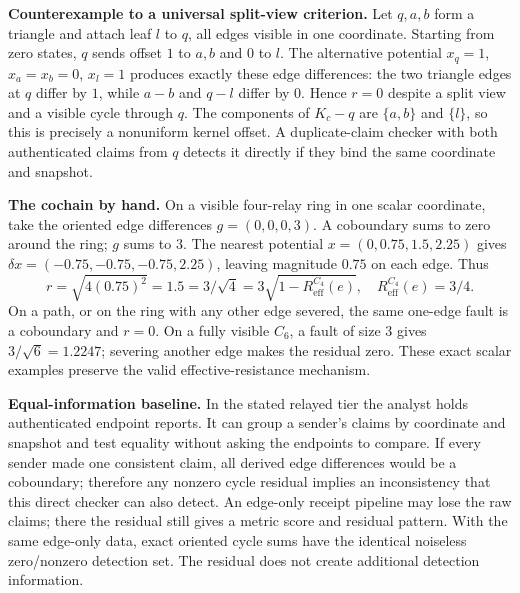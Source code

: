 \documentclass[11pt,a4paper]{article}
\begin{document}
\textbf{Counterexample to a universal split-view criterion.} Let $q,a,b$ form a triangle and attach leaf $l$ to $q$, all edges visible in one coordinate. Starting from zero states, $q$ sends offset $1$ to $a,b$ and $0$ to $l$. The alternative potential $x_q=1$, $x_a=x_b=0$, $x_l=1$ produces exactly these edge differences: the two triangle edges at $q$ differ by $1$, while $a-b$ and $q-l$ differ by $0$. Hence $r=0$ despite a split view and a visible cycle through $q$. The components of $K_c-q$ are $\{a,b\}$ and $\{l\}$, so this is precisely a nonuniform kernel offset. A duplicate-claim checker with both authenticated claims from $q$ detects it directly if they bind the same coordinate and snapshot.

\textbf{The cochain by hand.} On a visible four-relay ring in one scalar coordinate, take the oriented edge differences $g=(0,0,0,3)$. A coboundary sums to zero around the ring; $g$ sums to $3$. The nearest potential $x=(0,0.75,1.5,2.25)$ gives $\delta x=(-0.75,-0.75,-0.75,2.25)$, leaving magnitude $0.75$ on each edge. Thus
\[
r=\sqrt{4(0.75)^2}=1.5=3/\sqrt4=3\sqrt{1-R_{\mathrm{eff}}^{C_4}(e)},\quad R_{\mathrm{eff}}^{C_4}(e)=3/4.
\]
On a path, or on the ring with any other edge severed, the same one-edge fault is a coboundary and $r=0$. On a fully visible $C_6$, a fault of size $3$ gives $3/\sqrt6=1.2247$; severing another edge makes the residual zero. These exact scalar examples preserve the valid effective-resistance mechanism.



\textbf{Equal-information baseline.} In the stated relayed tier the analyst holds authenticated endpoint reports. It can group a sender's claims by coordinate and snapshot and test equality without asking the endpoints to compare. If every sender made one consistent claim, all derived edge differences would be a coboundary; therefore any nonzero cycle residual implies an inconsistency that this direct checker can also detect. An edge-only receipt pipeline may lose the raw claims; there the residual still gives a metric score and residual pattern. With the same edge-only data, exact oriented cycle sums have the identical noiseless zero/nonzero detection set. The residual does not create additional detection information.
\end{document}
